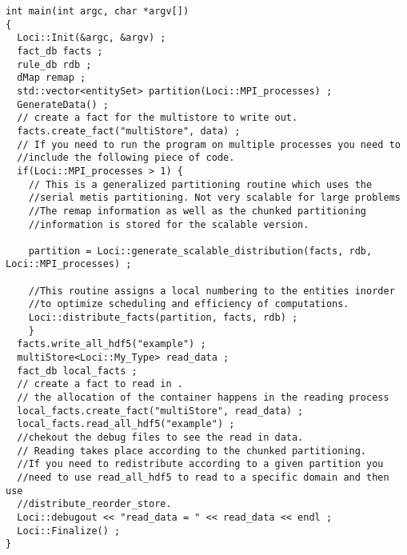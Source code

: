 \begin{verbatim}
int main(int argc, char *argv[])
{ 
  Loci::Init(&argc, &argv) ;
  fact_db facts ;
  rule_db rdb ;
  dMap remap ;
  std::vector<entitySet> partition(Loci::MPI_processes) ;
  GenerateData() ;
  // create a fact for the multistore to write out. 
  facts.create_fact("multiStore", data) ; 
  // If you need to run the program on multiple processes you need to
  //include the following piece of code. 
  if(Loci::MPI_processes > 1) {
    // This is a generalized partitioning routine which uses the
    //serial metis partitioning. Not very scalable for large problems
    //The remap information as well as the chunked partitioning
    //information is stored for the scalable version. 
    
    partition = Loci::generate_scalable_distribution(facts, rdb, Loci::MPI_processes) ;
    
    //This routine assigns a local numbering to the entities inorder
    //to optimize scheduling and efficiency of computations. 
    Loci::distribute_facts(partition, facts, rdb) ;
    }
  facts.write_all_hdf5("example") ;
  multiStore<Loci::My_Type> read_data ;
  fact_db local_facts ;
  // create a fact to read in .
  // the allocation of the container happens in the reading process 
  local_facts.create_fact("multiStore", read_data) ;
  local_facts.read_all_hdf5("example") ;
  //chekout the debug files to see the read in data. 
  // Reading takes place according to the chunked partitioning. 
  //If you need to redistribute according to a given partition you
  //need to use read_all_hdf5 to read to a specific domain and then use 
  //distribute_reorder_store.
  Loci::debugout << "read_data = " << read_data << endl ;
  Loci::Finalize() ;
}
 
\end{verbatim}
    

